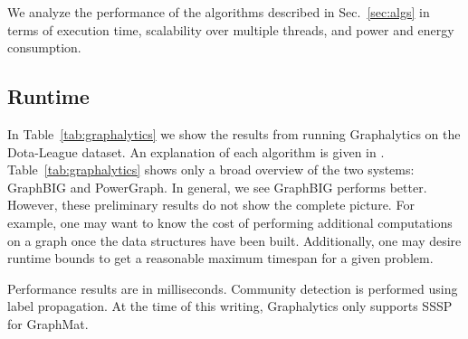 \documentclass{llncs}
\begin{document}
We analyze the performance of the algorithms described in Sec.~\ref{sec:algs} in terms of execution time, scalability over multiple threads, and power and energy consumption.

\subsection{Runtime}

In Table~\ref{tab:graphalytics} we show the results from running Graphalytics on the Dota-League dataset. An explanation of each algorithm is given in \cite{Iosup:2016:Graphalyticstech}. Table~\ref{tab:graphalytics} shows only a broad overview of the two systems: GraphBIG and PowerGraph. In general, we see GraphBIG performs better. However, these preliminary results do not show the complete picture. For example, one may want to know the cost of performing additional computations on a graph once the data structures have been built. Additionally, one may desire runtime bounds to get a reasonable maximum timespan for a given problem.


\begin{table}
	\caption{Performance results are in milliseconds. Community detection is performed using label propagation. At the time of this writing, Graphalytics only supports SSSP for GraphMat.}
	\centering
	\label{tab:graphalytics}
\end{table}
\end{document}
